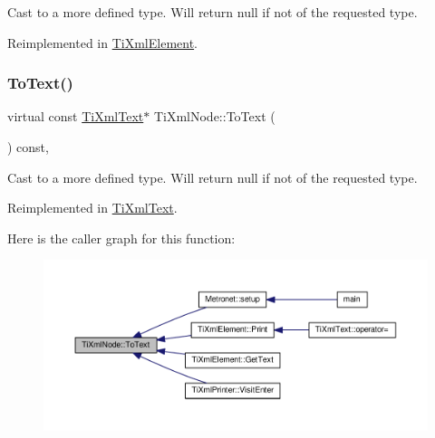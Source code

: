 Cast to a more defined type. Will return null if not of the requested type. 



Reimplemented in \hyperlink{class_ti_xml_element_a9def86337ea7a755eb41cac980f60c7a}{Ti\+Xml\+Element}.

\mbox{\label{class_ti_xml_node_a2591700660b308571c09166559a39332}} 
\subsubsection{\texorpdfstring{To\+Text()}{ToText()}\hspace{0.1cm}{\footnotesize\ttfamily [1/2]}}
{\footnotesize\ttfamily virtual const \hyperlink{class_ti_xml_text}{Ti\+Xml\+Text}$\ast$ Ti\+Xml\+Node\+::\+To\+Text (\begin{DoxyParamCaption}{ }\end{DoxyParamCaption}) const\hspace{0.3cm}{\ttfamily [inline]}, {\ttfamily [virtual]}}



Cast to a more defined type. Will return null if not of the requested type. 



Reimplemented in \hyperlink{class_ti_xml_text_af8973cfd4ca00c5d934cb23e8aa0f5d5}{Ti\+Xml\+Text}.

Here is the caller graph for this function\+:\nopagebreak
\begin{figure}[H]
\begin{center}
\leavevmode
\includegraphics[width=350pt]{class_ti_xml_node_a2591700660b308571c09166559a39332_icgraph}
\end{center}
\end{figure}
\mbox{\label{class_ti_xml_node_a3ddfbcac78fbea041fad57e5c6d60a03}} 

